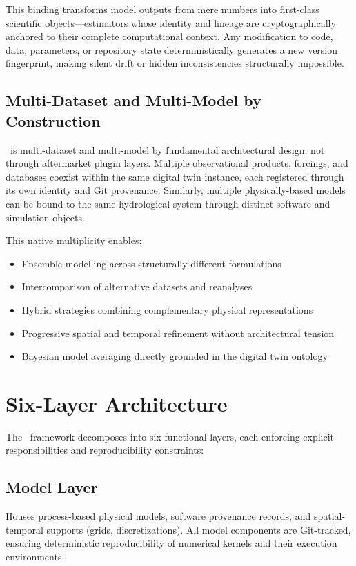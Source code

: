 This binding transforms model outputs from mere numbers into first-class scientific objects---estimators whose identity and lineage are cryptographically anchored to their complete computational context. Any modification to code, data, parameters, or repository state deterministically generates a new version fingerprint, making silent drift or hidden inconsistencies structurally impossible.

\subsection{Multi-Dataset and Multi-Model by Construction}

\hydrot\ is multi-dataset and multi-model by fundamental architectural design, not through aftermarket plugin layers. Multiple observational products, forcings, and databases coexist within the same digital twin instance, each registered through its own identity and Git provenance. Similarly, multiple physically-based models can be bound to the same hydrological system through distinct software and simulation objects.

This native multiplicity enables:
\begin{itemize}
\item Ensemble modelling across structurally different formulations
\item Intercomparison of alternative datasets and reanalyses
\item Hybrid strategies combining complementary physical representations
\item Progressive spatial and temporal refinement without architectural tension
\item Bayesian model averaging directly grounded in the digital twin ontology
\end{itemize}

\section{Six-Layer Architecture}

The \hydrot\ framework decomposes into six functional layers, each enforcing explicit responsibilities and reproducibility constraints:

\subsection{Model Layer}

Houses process-based physical models, software provenance records, and spatial-temporal supports (grids, discretizations). All model components are Git-tracked, ensuring deterministic reproducibility of numerical kernels and their execution environments.

